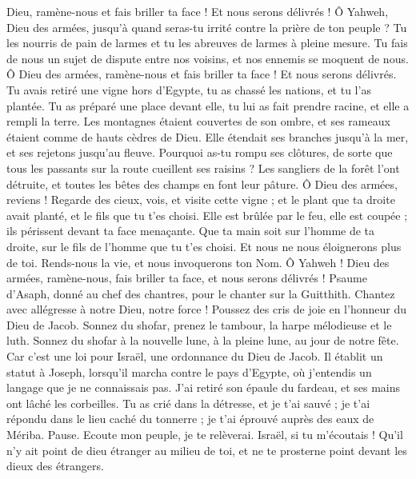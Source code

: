 \begin{multicols}{2}
Dieu, ramène-nous et fais briller ta face ! Et nous serons délivrés !
Ô Yahweh, Dieu des armées, jusqu’à quand seras-tu irrité contre la prière de ton peuple ?
Tu les nourris de pain de larmes et tu les abreuves de larmes à pleine mesure.
Tu fais de nous un sujet de dispute entre nos voisins, et nos ennemis se moquent de nous.
Ô Dieu des armées, ramène-nous et fais briller ta face ! Et nous serons délivrés.
Tu avais retiré une vigne hors d'Egypte, tu as chassé les nations, et tu l’as plantée.
Tu as préparé une place devant elle, tu lui as fait prendre racine, et elle a rempli la terre.
Les montagnes étaient couvertes de son ombre, et ses rameaux étaient comme de hauts cèdres de Dieu.
Elle étendait ses branches jusqu'à la mer, et ses rejetons jusqu'au fleuve.
Pourquoi as-tu rompu ses clôtures, de sorte que tous les passants sur la route cueillent ses raisins ?
Les sangliers de la forêt l'ont détruite, et toutes les bêtes des champs en font leur pâture.
Ô Dieu des armées, reviens ! Regarde des cieux, vois, et visite cette vigne ;
et le plant que ta droite avait planté, et le fils que tu t’es choisi.
Elle est brûlée par le feu, elle est coupée ; ils périssent devant ta face menaçante.
Que ta main soit sur l'homme de ta droite, sur le fils de l'homme que tu t'es choisi.
Et nous ne nous éloignerons plus de toi. Rends-nous la vie, et nous invoquerons ton Nom.
Ô Yahweh ! Dieu des armées, ramène-nous, fais briller ta face, et nous serons délivrés !
\VerseOne{}Psaume d'Asaph, donné au chef des chantres, pour le chanter sur la Guitthith.
Chantez avec allégresse à notre Dieu, notre force ! Poussez des cris de joie en l'honneur du Dieu de Jacob.
Sonnez du shofar, prenez le tambour, la harpe mélodieuse et le luth.
Sonnez du shofar à la nouvelle lune, à la pleine lune, au jour de notre fête.
Car c'est une loi pour Israël, une ordonnance du Dieu de Jacob.
Il établit un statut à Joseph, lorsqu'il marcha contre le pays d'Egypte, où j'entendis un langage que je ne connaissais pas.
J'ai retiré son épaule du fardeau, et ses mains ont lâché les corbeilles.
Tu as crié dans la détresse, et je t’ai sauvé ; je t'ai répondu dans le lieu caché du tonnerre ; je t'ai éprouvé auprès des eaux de Mériba. Pause.
Ecoute mon peuple, je te relèverai. Israël, si tu m'écoutais !
Qu’il n’y ait point de dieu étranger au milieu de toi, et ne te prosterne point devant les dieux des étrangers.

\end{multicols}
